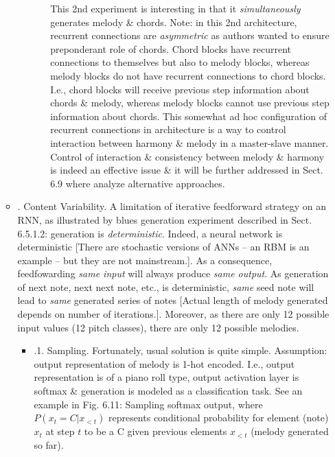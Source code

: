 \documentclass{article}
\begin{document}
\begin{itemize}
\begin{itemize}
\begin{itemize}
\begin{itemize}
				This 2nd experiment is interesting in that it {\it simultaneously} generates melody \& chords. Note: in this 2nd architecture, recurrent connections are {\it asymmetric} as authors wanted to ensure preponderant role of chords. Chord blocks have recurrent connections to themselves but also to melody blocks, whereas melody blocks do not have recurrent connections to chord blocks. I.e., chord blocks will receive previous step information about chords \& melody, whereas melody blocks cannot use previous step information about chords. This somewhat ad hoc configuration of recurrent connections in architecture is a way to control interaction between harmony \& melody in a master-slave manner. Control of interaction \& consistency between melody \& harmony is indeed an effective issue \& it will be further addressed in Sect. 6.9 where analyze alternative approaches.
			\end{itemize}
		\end{itemize}
		\item {. Content Variability.} A limitation of iterative feedforward strategy on an RNN, as illustrated by blues generation experiment described in Sect. 6.5.1.2: generation is {\it deterministic}. Indeed, a neural network is deterministic [There are stochastic versions of ANNs -- an RBM is an example -- but they are not mainstream.]. As a consequence, feedfowarding {\it same input} will always produce {\it same output}. As generation of next note, next next note, etc., is deterministic, {\it same} seed note will lead to {\it same} generated series of notes [Actual length of melody generated depends on number of iterations.]. Moreover, as there are only 12 possible input values (12 pitch classes), there are only 12 possible melodies.
		\begin{itemize}
			\item {.1. Sampling.} Fortunately, usual solution is quite simple. Assumption: output representation of melody is 1-hot encoded. I.e., output representation is of a piano roll type, output activation layer is softmax \& generation is modeled as a classification task. See an example in {\sf Fig. 6.11: Sampling softmax output}, where $P(x_t = C|x_{<t})$ represents conditional probability for element (note) $x_t$ at step $t$ to be a C given previous elements $x_{<t}$ (melody generated so far).


\end{itemize}
\end{itemize}
\end{itemize}
\end{document}
